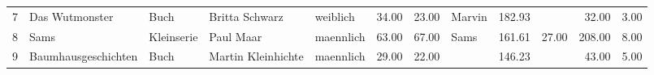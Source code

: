 \begin{table}
\begin{center}
{\begin{tabular}{rllllrrlrrrr}
  7 & Das Wutmonster                                                                                                                                                                                                                                                  & Buch & Britta Schwarz                                                                                                                                                                                                                                                  & weiblich & 34.00 & 23.00 & Marvin                                                                                                                                                                                                                                                          & 182.93 &  & 32.00 & 3.00 \\ 
  8 & Sams                                                                                                                                                                                                                                                            & Kleinserie & Paul Maar                                                                                                                                                                                                                                                       & maennlich & 63.00 & 67.00 & Sams                                                                                                                                                                                                                                                            & 161.61 & 27.00 & 208.00 & 8.00 \\ 
  9 & Baumhausgeschichten                                                                                                                                                                                                                                             & Buch & Martin Kleinhichte                                                                                                                                                                                                                                              & maennlich & 29.00 & 22.00 &                                                                                                                                                                                                                                                                 & 146.23 &  & 43.00 & 5.00 \\ 

\end{tabular}}
\end{center}
\end{table}

